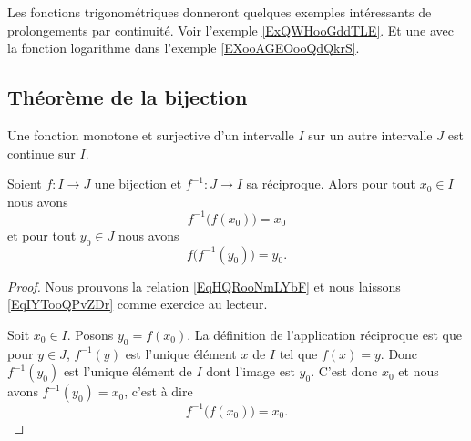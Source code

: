 Les fonctions trigonométriques donneront quelques exemples intéressants de prolongements par continuité. Voir l'exemple \ref{ExQWHooGddTLE}. Et une avec la fonction logarithme dans l'exemple \ref{EXooAGEOooQdQkrS}.


\subsection{Théorème de la bijection}

\begin{proposition} \label{PropOARooUuCaYT}
    Une fonction monotone et surjective d'un intervalle $I$ sur un autre intervalle $J$ est continue sur $I$.
\end{proposition}

\begin{proposition}
    Soient \( f\colon I\to J\) une bijection et \( f^{-1}\colon J\to I\) sa réciproque. Alors pour tout \( x_0\in I\) nous avons
    \begin{equation}    \label{EqHQRooNmLYbF}
        f^{-1}\big( f(x_0) \big)=x_0
    \end{equation}
    et pour tout \( y_0\in J\) nous avons
    \begin{equation}    \label{EqIYTooQPvZDr}
        f\big( f^{-1}(y_0) \big)=y_0.
    \end{equation}
\end{proposition}

\begin{proof}
    Nous prouvons la relation \eqref{EqHQRooNmLYbF} et nous laissons \eqref{EqIYTooQPvZDr} comme exercice au lecteur.

    Soit \( x_0\in I\). Posons \( y_0=f(x_0)\). La définition de l'application réciproque est que pour \( y\in J\), \( f^{-1}(y)\) est l'unique élément \( x\) de \( I\) tel que \( f(x)=y\). Donc \( f^{-1}(y_0)\) est l'unique élément de \( I\) dont l'image est \( y_0\). C'est donc \( x_0\) et nous avons \( f^{-1}(y_0)=x_0\), c'est à dire
    \begin{equation}
        f^{-1}\big( f(x_0) \big)=x_0.
    \end{equation}
\end{proof}

